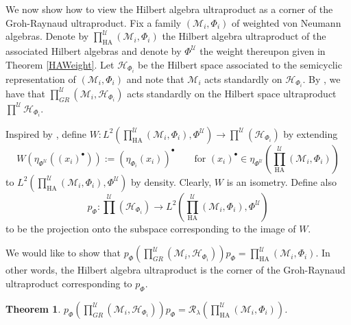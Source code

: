 \documentclass[12pt]{amsart}
\newtheorem{thm}{Theorem}[section]
\theoremstyle{definition}
\def\cal{\mathcal}
\newcommand\cU{{\cal U}}
\newcommand\R{{\cal R}}
\def \HA{\operatorname{HA}}
\begin{document}
We now show how to view the Hilbert algebra ultraproduct as a corner of the Groh-Raynaud ultraproduct.  Fix a family $(\cal M_i, \Phi_i)$ of weighted von Neumann algebras.  Denote by $\prod_{\HA}^{\cU}(\cal M_i, \Phi_i)$ the Hilbert algebra ultraproduct of the associated Hilbert algebras and denote by $\Phi^\cU$ the weight thereupon given in Theorem \ref{HAWeight}.  Let $\cal H_{\Phi_i}$ be the Hilbert space associated to the semicyclic representation of $(\cal M_i, \Phi_i)$ and note that $\cal M_i$ acts standardly on $\cal H_{\Phi_i}$.  By \cite[Theorem 3.18]{AH}, we have that $\prod^{\cU}_{GR} (\cal M_i, \cal H_{\Phi_i})$ acts standardly on the Hilbert space ultraproduct $\prod^{\cU} \cal H_{\Phi_i}$.

Inspired by \cite[Theorem 3.7]{AH}, define $W: L^2\left(\prod_{\HA}^{\cU}(\cal M_i, \Phi_i),\Phi^\cU\right) \to \prod^{\cU} (\cal H_{\Phi_i})$ by extending
\[
W(\eta_{\Phi^\cU}((x_i)^\bullet)) := (\eta_{\Phi_i}(x_i))^\bullet \qquad \text{for } (x_i)^\bullet \in \eta_{\Phi^\cU}\left(\prod_{\HA}^{\cU}(\cal M_i, \Phi_i)\right)
\]
to $L^2\left(\prod_{\HA}^{\cU}(\cal M_i, \Phi_i),\Phi^\cU\right)$ by density.  Clearly, $W$ is an isometry.  Define also
\[
p_{\Phi}: \prod^{\cU} (\cal H_{\Phi_i}) \to L^2\left(\prod_{\HA}^{\cU}(\cal M_i, \Phi_i),\Phi^\cU\right)
\]
to be the projection onto the subspace corresponding to the image of $W$.

We would like to show that $p_{\Phi}\left( \prod^{\cU}_{GR} (\cal M_i, \cal H_{\Phi_i})\right)p_{\Phi} = \prod_{\HA}^{\cU}(\cal M_i, \Phi_i)$.  In other words, the Hilbert algebra ultraproduct is the corner of the Groh-Raynaud ultraproduct corresponding to $p_{\Phi}$.

\begin{thm}\label{ultracorner}
    $p_{\Phi}\left( \prod^{\cU}_{GR} (\cal M_i, \cal H_{\Phi_i})\right)p_{\Phi} = \R_{\lambda}\left(\prod_{\HA}^{\cU}(\cal M_i, \Phi_i)\right)$.
\end{thm}
\end{document}
